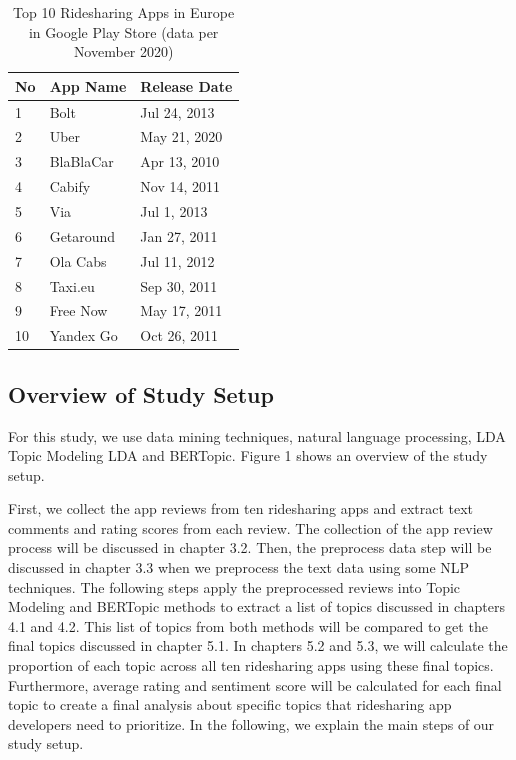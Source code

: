 \documentclass[12pt]{article}
\begin{document}
\begin{table}[h]
\centering
\caption{Top 10 Ridesharing Apps in Europe in Google Play Store (data per November 2020)}
\begin{tabular}{lll}
\hline
\textbf{No} & \textbf{App Name} & \textbf{Release Date}  \\
\hline
1           & Bolt              & Jul 24, 2013           \\
2           & Uber              & May 21, 2020           \\
3           & BlaBlaCar         & Apr 13, 2010           \\
4           & Cabify            & Nov 14, 2011           \\
5           & Via               & Jul 1, 2013            \\
6           & Getaround         & Jan 27, 2011           \\
7           & Ola Cabs          & Jul 11, 2012           \\
8           & Taxi.eu           & Sep 30, 2011           \\
9           & Free Now          & May 17, 2011           \\
10          & Yandex Go         & Oct 26, 2011       \\
\hline
\end{tabular}
\label{tab:top10_appstore}
\end{table}


\newpage

\subsection{Overview of Study Setup}
For this study, we use data mining techniques, natural language processing, LDA Topic Modeling LDA and BERTopic. Figure 1 shows an overview of the study setup. 

First, we collect the app reviews from ten ridesharing apps and extract text comments and rating scores from each review. The collection of the app review process will be discussed in chapter 3.2. Then, the preprocess data step will be discussed in chapter 3.3 when we preprocess the text data using some NLP techniques. The following steps apply the preprocessed reviews into Topic Modeling and BERTopic methods to extract a list of topics discussed in chapters 4.1 and 4.2. This list of topics from both methods will be compared to get the final topics discussed in chapter 5.1. In chapters 5.2 and 5.3, we will calculate the proportion of each topic across all ten ridesharing apps using these final topics. Furthermore, average rating and sentiment score will be calculated for each final topic to create a final analysis about specific topics that ridesharing app developers need to prioritize. In the following, we explain the main steps of our study setup.
\end{document}
